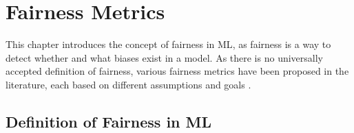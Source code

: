 \documentclass[12pt, a4paper, oneside]{book}   	%
\newcommand{\bolditalic}[1]{\textbf{\textit{{#1}}}}
\begin{document}

			
		\section{Fairness Metrics}
		This chapter introduces the concept of fairness in \gls{ML}, as fairness is a way to detect whether and what biases exist in a model. As there is no universally accepted definition of fairness, various fairness metrics have been proposed in the literature, each based on different assumptions and goals \autocite{Mehrabi_2021}.
		
		
		\subsection{Definition of Fairness in \gls{ML}}
		
\end{document}
